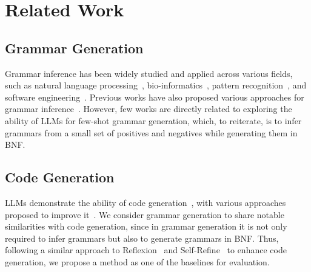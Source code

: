 \section{Related Work}
\subsection{Grammar Generation}
Grammar inference has been widely studied and applied across various fields, such as natural language processing~\cite{kai2024leveraginggrammarinductionlanguage,D_Ulizia_Ferri_Grifoni_2011}, bio-informatics~\cite{de2010grammatical}, pattern recognition~\cite{Pedro2013Using, Richetin1984Efficient,de2010grammatical}, and software engineering~\cite{Schröder_Cito_2022, Stevenson_Cordy_2014}. Previous works have also proposed various approaches for grammar inference~\cite{Rodrigues2007GeneticPF, Cohen2017InducingRG,ga-metagrammar, Dulizia2011A, chen1995bayesian}. However, few works are directly related to exploring the ability of LLMs for few-shot grammar generation, which, to reiterate, is to infer grammars from a small set of positives and negatives while generating them in BNF. 

\subsection{Code Generation}
LLMs demonstrate the ability of code generation~\cite{Jiang2024A,Huang2023AgentCoder,dehaerne2022}, with various approaches proposed to improve it~\cite{shinn2023reflexion, madaan2023selfrefine, Huang2023AgentCoder, Jiang2023SelfPlanning, Chen2023Teaching}. We consider grammar generation to share notable similarities with code generation, since in grammar generation it is not only required to infer grammars but also to generate grammars in BNF. Thus, following a similar approach to Reflexion~\cite{shinn2023reflexion} and Self-Refine~\cite{madaan2023selfrefine} to enhance code generation, we propose a method as one of the baselines for evaluation.